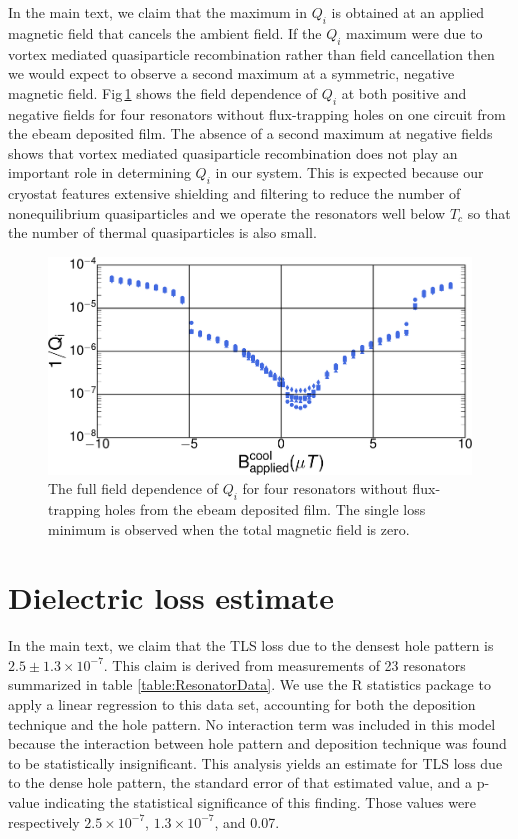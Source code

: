 In the main text, we claim that the maximum in $Q_i$ is obtained at an applied magnetic field that cancels the ambient field.  If the $Q_i$ maximum were due to vortex mediated quasiparticle recombination\cite{nsanzineza2014} rather than field cancellation then we would expect to observe a second maximum at a symmetric, negative magnetic field.   Fig\,\ref{fullfield} shows the field dependence of $Q_i$ at both positive and negative fields for four resonators without flux-trapping holes on one circuit from the ebeam deposited film.  The absence of a second maximum at negative fields shows that vortex mediated quasiparticle recombination does not play an important role in determining $Q_{i}$ in our system.  This is expected because our cryostat features extensive shielding and filtering to reduce the number of nonequilibrium quasiparticles and we operate the resonators well below $T_c$ so that the number of thermal quasiparticles is also small.

\begin{figure}
    \begin{center}
        \includegraphics[width=150mm]{DielectricFluxTrap_Supp_Rev2_fullfield.pdf}
        \caption{The full field dependence of $Q_i$ for four resonators without flux-trapping holes from the ebeam deposited film.  The single loss minimum is observed when the total magnetic field is zero.}
        \label{fullfield}
    \end{center}
\end{figure}

\section{Dielectric loss estimate}
In the main text, we claim that the TLS loss due to the densest hole pattern is $2.5 \pm 1.3\times 10^{-7}$.  This claim is derived from measurements of 23 resonators summarized in table \ref{table:ResonatorData}.  We use the R statistics package\cite{R} to apply a linear regression to this data set, accounting for both the deposition technique and the hole pattern.  No interaction term was included in this model because the interaction between hole pattern and deposition technique was found to be statistically insignificant.  This analysis yields an estimate for TLS loss due to the dense hole pattern, the standard error of that estimated value, and a p-value indicating the statistical significance of this finding.  Those values were respectively $2.5\times10^{-7}$, $1.3\times10^{-7}$, and 0.07.

